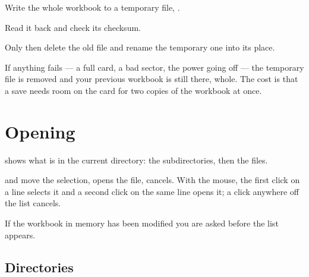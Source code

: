 \begin{ccprocedure}
\item Write the whole workbook to a temporary file, .
\item Read it back and check its checksum.
\item Only then delete the old file and rename the temporary one into its
place.
\end{ccprocedure}

If anything fails --- a full card, a bad sector, the power going off --- the
temporary file is removed and your previous workbook is still there, whole. The
cost is that a save needs room on the card for two copies of the workbook at
once.

\section{Opening}

 shows what is in the current directory: the subdirectories, then the
 files.

\begin{ccfigure}
\caption{The file list. The title row says where you are;  goes back
up and  goes in}
\label{fig:filepicker}
\end{ccfigure}

\key{$\uparrow$} and \key{$\downarrow$} move the selection,  opens
the file,  cancels. With the mouse, the first click on a line selects
it and a second click on the same line opens it; a click anywhere off the list
cancels.

If the workbook in memory has been modified you are asked  before the list appears.

\subsection{Directories}

